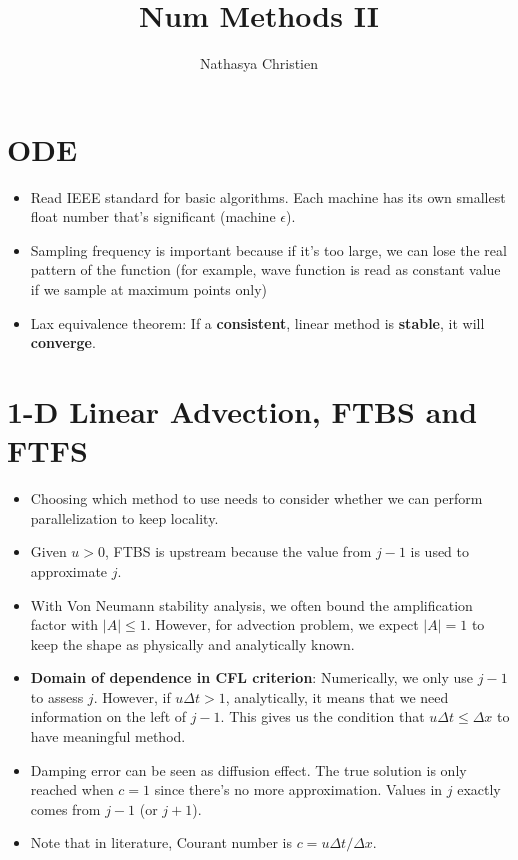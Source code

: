 \documentclass{article}
\title{Num Methods II}
\author{Nathasya Christien}
\begin{document}
\maketitle

\section{ODE}
\begin{itemize}
    \item Read IEEE standard for basic algorithms. Each machine has its own smallest float number that's significant (machine $\epsilon$).
    \item Sampling frequency is important because if it's too large, we can lose the real pattern of the function (for example, wave function is read as constant value if we sample at maximum points only)
    \item Lax equivalence theorem: If a \textbf{consistent}, linear method is \textbf{stable}, it will \textbf{converge}.
\end{itemize}

\section{1-D Linear Advection, FTBS and FTFS}
\begin{itemize}
    \item Choosing which method to use needs to consider whether we can perform parallelization to keep locality.
    \item Given $u>0$, FTBS is upstream because the value from $j-1$ is used to approximate $j$.
    \item With Von Neumann stability analysis, we often bound the amplification factor with $|A|\leq1$. However, for advection problem, we expect $|A|=1$ to keep the shape as physically and analytically known.
    \item \textbf{Domain of dependence in CFL criterion}: Numerically, we only use $j-1$ to assess $j$. However, if $u\Delta t > 1$, analytically, it means that we need information on the left of $j-1$. This gives us the condition that $u\Delta t \leq \Delta x$ to have meaningful method.
    \item Damping error can be seen as diffusion effect. The true solution is only reached when $c=1$ since there's no more approximation. Values in $j$ exactly comes from $j-1$ (or $j+1$).
    \item Note that in literature, Courant number is $c=u\Delta t / \Delta x$.
\end{itemize}
\end{document}
